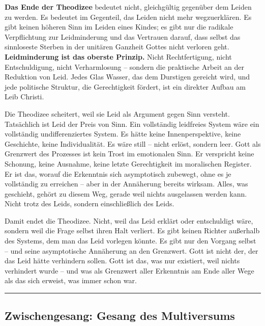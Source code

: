 \documentclass[
  ngerman,
]{article}
\begin{document}
\textbf{Das Ende der Theodizee} bedeutet nicht, gleichgültig gegenüber
dem Leiden zu werden. Es bedeutet im Gegenteil, das Leiden nicht mehr
wegzuerklären. Es gibt keinen höheren Sinn im Leiden eines Kindes; es
gibt nur die radikale Verpflichtung zur Leidminderung und das Vertrauen
darauf, dass selbst das sinnloseste Sterben in der unitären Ganzheit
Gottes nicht verloren geht. \textbf{Leidminderung ist das oberste
Prinzip.} Nicht Rechtfertigung, nicht Entschuldigung, nicht
Verharmlosung -- sondern die praktische Arbeit an der Reduktion von
Leid. Jedes Glas Wasser, das dem Durstigen gereicht wird, und jede
politische Struktur, die Gerechtigkeit fördert, ist ein direkter Aufbau
am Leib Christi.

Die Theodizee scheitert, weil sie Leid als Argument gegen Sinn versteht.
Tatsächlich ist Leid der Preis von Sinn. Ein vollständig leidfreies
System wäre ein vollständig undifferenziertes System. Es hätte keine
Innenperspektive, keine Geschichte, keine Individualität. Es wäre still
-- nicht erlöst, sondern leer. Gott als Grenzwert des Prozesses ist kein
Trost im emotionalen Sinn. Er verspricht keine Schonung, keine Ausnahme,
keine letzte Gerechtigkeit im moralischen Register. Er ist das, worauf
die Erkenntnis sich asymptotisch zubewegt, ohne es je vollständig zu
erreichen -- aber in der Annäherung bereits wirksam. Alles, was
geschieht, gehört zu diesem Weg, gerade weil nichts ausgelassen werden
kann. Nicht trotz des Leids, sondern einschließlich des Leids.

Damit endet die Theodizee. Nicht, weil das Leid erklärt oder
entschuldigt wäre, sondern weil die Frage selbst ihren Halt verliert. Es
gibt keinen Richter außerhalb des Systems, dem man das Leid vorlegen
könnte. Es gibt nur den Vorgang selbst -- und seine asymptotische
Annäherung an den Grenzwert. Gott ist nicht der, der das Leid hätte
verhindern sollen. Gott ist das, was nur existiert, weil nichts
verhindert wurde -- und was als Grenzwert aller Erkenntnis am Ende aller
Wege als das sich erweist, was immer schon war.

\begin{center}\rule{0.5\linewidth}{0.5pt}\end{center}

\subsection{Zwischengesang: Gesang des
Multiversums}\label{zwischengesang-gesang-des-multiversums}
\end{document}
